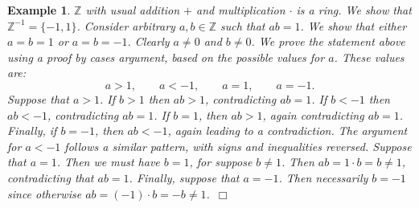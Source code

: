 \documentclass[12pt, oneside]{book}
\newtheorem{example}[theorem]{Example}
\newcommand{\qed}{\hfill ~$\Box$\\}
\begin{document}
\begin{example} \label{InvertiblesInZ}
\normalfont
$\mathbb{Z}$ with usual addition $+$ and multiplication $\cdot$ is a ring. We show that $\mathbb{Z}^{-1} = \{-1, 1\}$. Consider arbitrary $a, b \in \mathbb{Z}$ such that $a b=1$. We show that either $a = b = 1$ or $a = b = -1$.
\vskip 0.3cm
\noindent Clearly $a\not = 0$ and $b \not =0$. We prove the statement above using a proof by cases argument, based on the possible values for $a$. These values are:
$$a > 1, \qquad a < -1, \qquad a = 1, \qquad a = -1.$$ 
Suppose that $a > 1$. If $b > 1$ then $a b > 1$, contradicting $a b = 1$. If $b < -1$ then $a b < -1$, contradicting $a b = 1$. If $b = 1$, then $a b > 1$, again contradicting $a b = 1$. Finally, if $b = -1$, then $a b < -1$, again leading to a contradiction.
\vskip 0.3cm
\noindent The argument for $a < -1$ follows a similar pattern, with signs and inequalities reversed.
\vskip 0.3cm
\noindent Suppose that $a=1$. Then we must have $b=1$, for suppose $b \not = 1$. Then $a  b=1 \cdot b = b \not = 1$, contradicting that $a b=1$.
\vskip 0.3cm
\noindent Finally, suppose that $a=-1$. Then necessarily $b=-1$ since otherwise $a  b=(-1) \cdot b = -b \not = 1$.\qed

\end{example}
\end{document}
